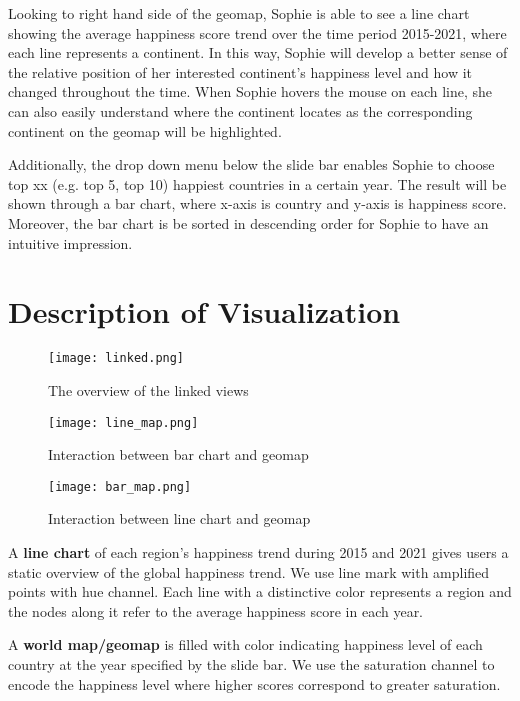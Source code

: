 \documentclass{article}
\begin{document}
Looking to right hand side of the geomap, Sophie is able to see a line chart showing the average happiness score trend over the time period 2015-2021, where each line represents a continent. In this way, Sophie will develop a better sense of the relative position of her interested continent's happiness level and how it changed throughout the time. When Sophie hovers the mouse on each line, she can also easily understand where the continent locates as the corresponding continent on the geomap will be highlighted.

Additionally, the drop down menu below the slide bar enables Sophie to choose top xx (e.g. top 5, top 10) happiest countries in a certain year. The result will be shown through a bar chart, where x-axis is country and y-axis is happiness score. Moreover, the bar chart is be sorted in descending order for Sophie to have an intuitive impression. 

\section{Description of Visualization}
\begin{figure}[!htb]
	\begin{center}
		\texttt{[image: linked.png]}
	\end{center}
	\caption{The overview of the linked views}
	\label{fig:geomap2}
\end{figure}

\begin{figure}[!htb]
\begin{minipage}[b]{.55\textwidth}
\centering
\texttt{[image: line\_map.png]}
\caption{Interaction between bar chart and geomap}
\label{fig:line}
\end{minipage}
\hfill
\begin{minipage}[b]{.40\textwidth}
\centering
\texttt{[image: bar\_map.png]}
\caption{Interaction between line chart and geomap}
\label{fig:bar}
\end{minipage}
\end{figure}

A \textbf{line chart} of each region's happiness trend during 2015 and 2021 gives users a static overview of the global happiness trend. We use line mark with amplified points with hue channel. Each line with a distinctive color represents a region and the nodes along it refer to the average happiness score in each year.

A \textbf{world map/geomap} is filled with color indicating happiness level of each country at the year specified by the slide bar. We use the saturation channel to encode the happiness level where higher scores correspond to greater saturation.   
\end{document}
